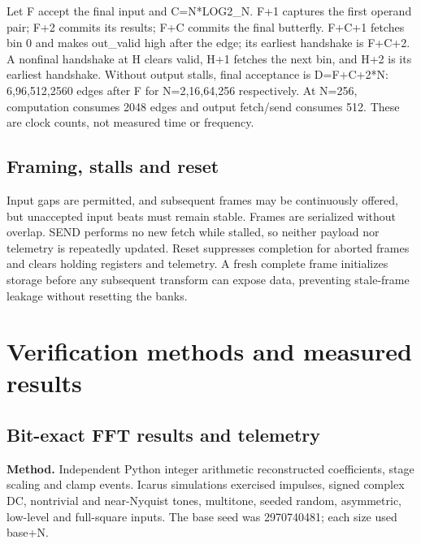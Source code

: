 \documentclass[11pt,a4paper]{article}
\begin{document}
Let F accept the final input and C=\allowbreak{}N*\allowbreak{}LOG2\_\allowbreak{}N. F+\allowbreak{}1 captures the first operand pair; F+\allowbreak{}2 commits its results; F+\allowbreak{}C commits the final butterfly. F+\allowbreak{}C+\allowbreak{}1 fetches bin 0 and makes out\_\allowbreak{}valid high after the edge; its earliest handshake is F+\allowbreak{}C+\allowbreak{}2. A nonfinal handshake at H clears valid,\allowbreak{} H+\allowbreak{}1 fetches the next bin,\allowbreak{} and H+\allowbreak{}2 is its earliest handshake. Without output stalls,\allowbreak{} final acceptance is D=\allowbreak{}F+\allowbreak{}C+\allowbreak{}2*\allowbreak{}N: 6,\allowbreak{}96,\allowbreak{}512,\allowbreak{}2560 edges after F for N=\allowbreak{}2,\allowbreak{}16,\allowbreak{}64,\allowbreak{}256 respectively. At N=\allowbreak{}256,\allowbreak{} computation consumes 2048 edges and output fetch/\allowbreak{}send consumes 512. These are clock counts,\allowbreak{} not measured time or frequency.

\subsection{Framing,\allowbreak{} stalls and reset}

Input gaps are permitted,\allowbreak{} and subsequent frames may be continuously offered,\allowbreak{} but unaccepted input beats must remain stable. Frames are serialized without overlap. SEND performs no new fetch while stalled,\allowbreak{} so neither payload nor telemetry is repeatedly updated. Reset suppresses completion for aborted frames and clears holding registers and telemetry. A fresh complete frame initializes storage before any subsequent transform can expose data,\allowbreak{} preventing stale-frame leakage without resetting the banks.

\section{Verification methods and measured results}

\subsection{Bit-exact FFT results and telemetry}

\textbf{Method.} Independent Python integer arithmetic reconstructed coefficients,\allowbreak{} stage scaling and clamp events. Icarus simulations exercised impulses,\allowbreak{} signed complex DC,\allowbreak{} nontrivial and near-Nyquist tones,\allowbreak{} multitone,\allowbreak{} seeded random,\allowbreak{} asymmetric,\allowbreak{} low-level and full-square inputs. The base seed was 2970740481; each size used base+\allowbreak{}N.
\end{document}

